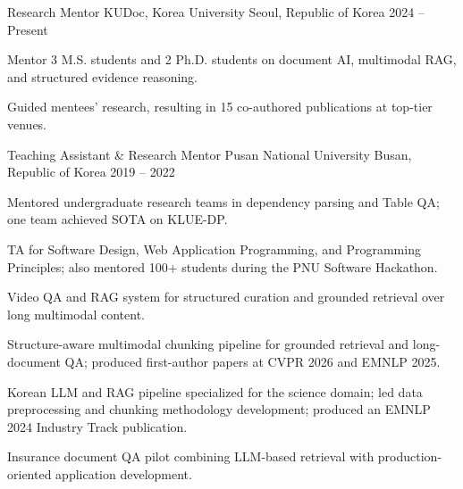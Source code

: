 \documentclass[11pt, a4paper]{awesome-cv}
\begin{document}

\begin{cventries}
  \cventry
    {Research Mentor}
    {KUDoc, Korea University}
    {Seoul, Republic of Korea}
    {2024 -- Present}
    {
      \begin{cvitems}
        \item {Mentor 3 M.S. students and 2 Ph.D. students on document AI, multimodal RAG, and structured evidence reasoning.}
        \item {Guided mentees' research, resulting in 15 co-authored publications at top-tier venues.}
      \end{cvitems}
    }\par
  \cventry
    {Teaching Assistant \& Research Mentor}
    {Pusan National University}
    {Busan, Republic of Korea}
    {2019 -- 2022}
    {
      \begin{cvitems}
        \item {Mentored undergraduate research teams in dependency parsing and Table QA; one team achieved SOTA on KLUE-DP.}
        \item {TA for Software Design, Web Application Programming, and Programming Principles; also mentored 100+ students during the PNU Software Hackathon.}
      \end{cvitems}
    }\par
\end{cventries}


\begin{cventries}
    {Video QA and RAG system for structured curation and grounded retrieval over long multimodal content.}\par
    {Structure-aware multimodal chunking pipeline for grounded retrieval and long-document QA; produced first-author papers at CVPR 2026 and EMNLP 2025.}\par
    {Korean LLM and RAG pipeline specialized for the science domain; led data preprocessing and chunking methodology development; produced an EMNLP 2024 Industry Track publication.}\par
    {Insurance document QA pilot combining LLM-based retrieval with production-oriented application development.}\par
\end{cventries}
\end{document}
